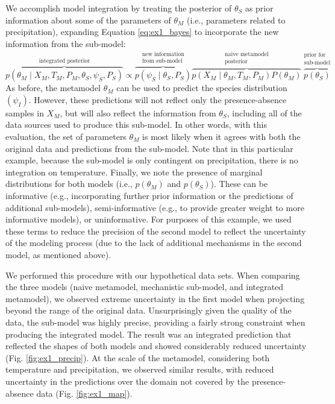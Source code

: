 \documentclass[11pt]{article}
\begin{document}
We accomplish model integration by treating the posterior of \(\theta_S\) as prior information about some of the parameters of \(\theta_M\) (i.e., parameters related to precipitation), expanding Equation \ref{eq:ex1_bayes} to incorporate the new information from the sub-model:
\begin{equation}
	\label{eq:ex1_integrated}
	\overbrace{p(\theta_M \mid X_M, T_M, P_M, \theta_S, \psi_S, P_S)}^\text{integrated posterior}
	\propto
	\overbrace{p\left (\psi_S \mid \theta_S,P_S \right )}^{\substack{\text{new information} \\ \text{from sub-model}}}
	\overbrace{p \left(X_M \mid \theta_M, T_M, P_M \right) P \left(\theta_M \right)}^{\substack{\text{naive metamodel} \\ \text{posterior}}}
	\overbrace{p \left(\theta_S \right)}^{\substack{\text{prior for} \\ \text{sub-model}}}	
\end{equation}
As before, the metamodel \(\theta_M\) can be used to predict the species distribution \((\psi_I)\).
However, these predictions will not reflect only the presence-absence samples in \(X_M\), but will also reflect the information from \(\theta_S\), including all of the data sources used to produce this sub-model.
In other words, with this evaluation, the set of parameters $\theta_M$ is most likely when it agrees with both the original data and predictions from the sub-model. 
Note that in this particular example, because the sub-model is only contingent on precipitation, there is no integration on temperature. 
Finally, we note the presence of marginal distributions for both models (i.e., \(p(\theta_M)\) and \(p(\theta_S)\)).
These can be informative (e.g., incorporating further prior information or the predictions of additional sub-models), semi-informative (e.g., to provide greater weight to more informative models), or uninformative.
For purposes of this example, we used these terms to reduce the precision of the second model to reflect the uncertainty of the modeling process (due to the lack of additional mechanisms in the second model, as mentioned above).

We performed this procedure with our hypothetical data sets.
When comparing the three models (naive metamodel, mechanistic sub-model, and integrated metamodel), we observed extreme uncertainty in the first model when projecting beyond the range of the original data.
Unsurprisingly given the quality of the data, the sub-model was highly precise, providing a fairly strong constraint when producing the integrated model.
The result was an integrated prediction that reflected the shapes of both models and showed considerably reduced uncertainty (Fig. \ref{fig:ex1_precip}).
At the scale of the metamodel, considering both temperature and precipitation, we observed similar results, with reduced uncertainty in the predictions over the domain not covered by the presence-absence data (Fig. \ref{fig:ex1_map}).
\end{document}
